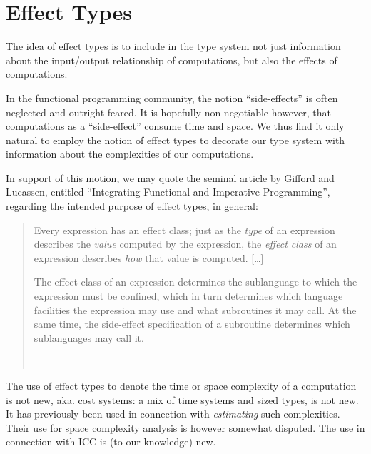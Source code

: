 \chapter{Effect Types}

The idea of effect types is to include in the type system not just information
about the input/output relationship of computations, but also the effects of
computations.

In the functional programming community, the notion ``side-effects'' is often
neglected and outright feared. It is hopefully non-negotiable however, that
computations as a ``side-effect'' consume time and space. We thus find it only
natural to employ the notion of effect types to decorate our type system with
information about the complexities of our computations.

In support of this motion, we may quote the seminal article by Gifford and
Lucassen, entitled ``Integrating Functional and Imperative Programming'',
regarding the intended purpose of effect types, in general:

\begin{quotation}

\footnotesize\sffamily\itshape

Every expression has an effect class; just as the \emph{type} of an expression
describes the \emph{value} computed by the expression, the \emph{effect class}
of an expression describes \emph{how} that value is computed. [\ldots]

The effect class of an expression determines the sublanguage to which the
expression must be confined, which in turn determines which language facilities
the expression may use and what subroutines it may call. At the same time, the
side-effect specification of a subroutine determines which sublanguages may
call it.

\begin{flushright}

\footnotesize\sffamily

--- \cite{gifford-lucassen-1986}

\end{flushright}

\end{quotation}

The use of effect types to denote the time or space complexity of a computation
is not new, aka. cost systems: a mix of time systems and sized types, is not
new. It has previously been used in connection with \emph{estimating} such
complexities\cite{dornic-et-al-1992,dornic-1993,reistad-gifford-1994}. Their
use for space complexity analysis is however somewhat
disputed\cite{crary-weirich-2000}. The use in connection with ICC is (to our
knowledge) new.
